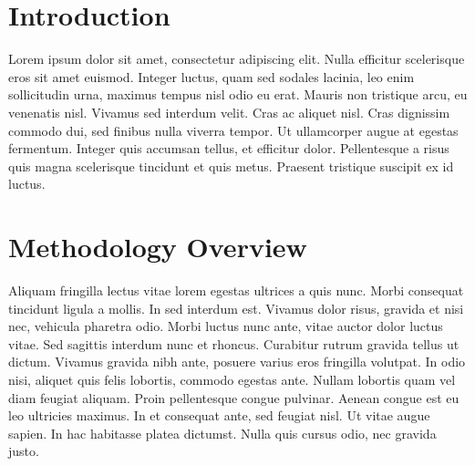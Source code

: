 \documentclass[
10pt, %
a4paper, %
twocolumn, %
landscape %
]{article}
\begin{document}
\pagestyle{myheadings} %
\markright{\doctitle} %


\thispagestyle{plain} %

\printtitle %


\section*{Introduction} %

Lorem ipsum dolor sit amet, consectetur adipiscing elit. Nulla efficitur scelerisque eros sit amet euismod. Integer luctus, quam sed sodales lacinia, leo enim sollicitudin urna, maximus tempus nisl odio eu erat. Mauris non tristique arcu, eu venenatis nisl. Vivamus sed interdum velit. Cras ac aliquet nisl. Cras dignissim commodo dui, sed finibus nulla viverra tempor. Ut ullamcorper augue at egestas fermentum. Integer quis accumsan tellus, et efficitur dolor. Pellentesque a risus quis magna scelerisque tincidunt et quis metus. Praesent tristique suscipit ex id luctus.


\section{Methodology Overview} %

Aliquam fringilla lectus vitae lorem egestas ultrices a quis nunc. Morbi consequat tincidunt ligula a mollis. In sed interdum est. Vivamus dolor risus, gravida et nisi nec, vehicula pharetra odio. Morbi luctus nunc ante, vitae auctor dolor luctus vitae. Sed sagittis interdum nunc et rhoncus. Curabitur rutrum gravida tellus ut dictum. Vivamus gravida nibh ante, posuere varius eros fringilla volutpat. In odio nisi, aliquet quis felis lobortis, commodo egestas ante. Nullam lobortis quam vel diam feugiat aliquam. Proin pellentesque congue pulvinar. Aenean congue est eu leo ultricies maximus. In et consequat ante, sed feugiat nisl. Ut vitae augue sapien. In hac habitasse platea dictumst. Nulla quis cursus odio, nec gravida justo.
\end{document}
